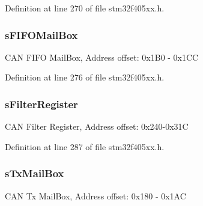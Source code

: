 Definition at line 270 of file stm32f405xx.\+h.

\subsubsection[{\texorpdfstring{s\+F\+I\+F\+O\+Mail\+Box}{sFIFOMailBox}}]{ s\+F\+I\+F\+O\+Mail\+Box}\hypertarget{struct_c_a_n___type_def_afdef128e1ffe70acd7033674f7980967}{}\label{struct_c_a_n___type_def_afdef128e1ffe70acd7033674f7980967}
C\+AN F\+I\+FO Mail\+Box, Address offset\+: 0x1\+B0 -\/ 0x1\+CC 

Definition at line 276 of file stm32f405xx.\+h.

\subsubsection[{\texorpdfstring{s\+Filter\+Register}{sFilterRegister}}]{ s\+Filter\+Register}\hypertarget{struct_c_a_n___type_def_aef658b2e9c6484d0c0f6202d627277fd}{}\label{struct_c_a_n___type_def_aef658b2e9c6484d0c0f6202d627277fd}
C\+AN Filter Register, Address offset\+: 0x240-\/0x31C 

Definition at line 287 of file stm32f405xx.\+h.

\subsubsection[{\texorpdfstring{s\+Tx\+Mail\+Box}{sTxMailBox}}]{ s\+Tx\+Mail\+Box}\hypertarget{struct_c_a_n___type_def_af9bdf5d33749953f3c815e6c8dc84ec0}{}\label{struct_c_a_n___type_def_af9bdf5d33749953f3c815e6c8dc84ec0}
C\+AN Tx Mail\+Box, Address offset\+: 0x180 -\/ 0x1\+AC 

